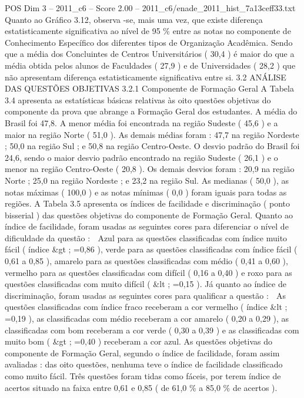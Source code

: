 \begin{textsample}{POS Dim 3 – 2011\_c6 – Score 2.00 – 2011\_c6/enade\_2011\_hist\_7a13ceff33.txt}
Quanto ao Gráfico 3.12, observa -se, mais uma vez, que existe diferença estatisticamente significativa ao nível de 95 \% entre as notas no componente de Conhecimento Específico dos diferentes tipos de Organização Acadêmica.
Sendo que a média dos Concluintes de Centros Universitários ( 30,4 ) é maior do que a média obtida pelos alunos de Faculdades ( 27,9 ) e de Universidades ( 28,2 ) que não apresentam diferença estatisticamente significativa entre si. 3.2 ANÁLISE DAS QUESTÕES OBJETIVAS 3.2.1 Componente de Formação Geral A Tabela 3.4 apresenta as estatísticas básicas relativas às oito questões objetivas do componente da prova que abrange a Formação Geral dos estudantes.
A média do Brasil foi 47,8.
A menor média foi encontrada na região Sudeste ( 45,6 ) e a maior na região Norte ( 51,0 ).
As demais médias foram : 47,7 na região Nordeste ; 50,0 na região Sul ; e 50,8 na região Centro-Oeste.
O desvio padrão do Brasil foi 24,6, sendo o maior desvio padrão encontrado na região Sudeste ( 26,1 ) e o menor na região Centro-Oeste ( 20,8 ).
Os demais desvios foram : 20,9 na região Norte ; 25,0 na região Nordeste ; e 23,2 na região Sul.
As medianas ( 50,0 ), as notas máximas ( 100,0 ) e as notas mínimas ( 0,0 ) foram iguais para todas as regiões.
A Tabela 3.5 apresenta os índices de facilidade e discriminação ( ponto bisserial ) das questões objetivas do componente de Formação Geral.
Quanto ao índice de facilidade, foram usadas as seguintes cores para diferenciar o nível de dificuldade da questão :  Azul para as questões classificadas com índice muito fácil ( índice \&gt ; =0,86 ), verde para as questões classificadas com índice fácil ( 0,61 a 0,85 ), amarelo para as questões classificadas com médio ( 0,41 a 0,60 ), vermelho para as questões classificadas com difícil ( 0,16 a 0,40 ) e roxo para as questões classificadas com muito difícil ( \&lt ; =0,15 ).
Já quanto ao índice de discriminação, foram usadas as seguintes cores para qualificar a questão :  As questões classificadas com índice fraco receberam a cor vermelho ( índice \&lt ; =0,19 ), as classificadas com médio receberam a cor amarelo ( 0,20 a 0,29 ), as classificadas com bom receberam a cor verde ( 0,30 a 0,39 ) e as classificadas com muito bom ( \&gt ; =0,40 ) receberam a cor azul.
As questões objetivas do componente de Formação Geral, segundo o índice de facilidade, foram assim avaliadas : das oito questões, nenhuma teve o índice de facilidade classificado como muito fácil.
Três questões foram tidas como fáceis, por terem índice de acertos situado na faixa entre 0,61 e 0,85 ( de 61,0 \% a 85,0 \% de acertos ).

\end{textsample}
